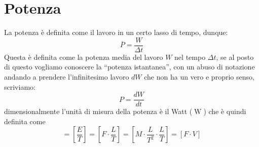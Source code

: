\section{Potenza}
    La potenza è definita come il lavoro in un certo lasso di tempo, dunque:
    \begin{equation}
        \overline{P}=\frac{W}{\Delta t}
    \end{equation}
    Questa è definita come la potenza media del lavoro $W$ nel tempo $\Delta t$, se al posto di questo vogliamo conoscere la ``potenza istantanea'', con un abuso di notazione andando a prendere l'infinitesimo lavoro $dW$ che non ha un vero e proprio senso, scriviamo:
    \begin{equation}
        P=\frac{dW}{dt}
    \end{equation}
    dimensionalmente l'unità di misura della potenza è il Watt ($\operatorname{W}$) che è quindi definita come
    \begin{equation*}
        [P]=\left[\frac{E}{T}\right]=\left[F\cdot\frac{L}{T}\right]=\left[M\cdot\frac{L}{T^2}\cdot\frac{L}{T}\right]=\left[F\cdot V\right]
    \end{equation*}